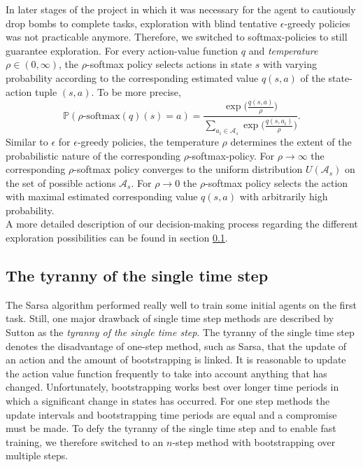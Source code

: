 In later stages of the project in which it was necessary for the agent to cautiously drop bombs to complete tasks, exploration with blind tentative $\epsilon$-greedy policies was not practicable anymore. Therefore, we switched to softmax-policies to still guarantee exploration. For every action-value function $q$ and \emph{temperature} $\rho \in (0, \infty)$, the $\rho$-softmax policy selects actions in state $s$ with varying probability according to the corresponding estimated value $q(s, a)$ of the state-action tuple $(s, a)$. To be more precise, 
\begin{equation*}
	\mathbb{P}(\rho\text{-softmax}(q)(s) = a) = \frac{\exp\Big(\frac{q(s, a)}{\rho}\Big)}{\sum_{a_i \in \mathcal{A}_s} \exp\Big(\frac{q(s, a_i)}{\rho}\Big)}.
\end{equation*}
Similar to $\epsilon$ for $\epsilon$-greedy policies, the temperature $\rho$ determines the extent of the probabilistic nature of the corresponding $\rho$-softmax-policy. For $\rho \rightarrow \infty$ the corresponding $\rho$-softmax policy converges to the uniform distribution $U(\mathcal{A}_s)$ on the set of possible actions $\mathcal{A}_s$. For $\rho \rightarrow 0$ the $\rho$-softmax policy selects the action with maximal estimated corresponding value $q(s, a)$ with arbitrarily high probability. \\

A more detailed description of our decision-making process regarding the different exploration possibilities can be found in section \ref{}.

\subsection{The tyranny of the single time step}

The Sarsa algorithm performed really well to train some initial agents on the first task. Still, one major drawback of single time step methods are described by Sutton as the \emph{tyranny of the single time step}. The tyranny of the single time step denotes the disadvantage of one-step method, such as Sarsa, that the update of an action and the amount of bootstrapping is linked. It is reasonable to update the action value function frequently to take into account anything that has changed. Unfortunately, bootstrapping works best  over longer time periods in which a significant change in states has occurred. For one step methods the update intervals and bootstrapping time periods are equal and a compromise must be made. To defy the tyranny of the single time step and to enable fast training, we therefore switched to an $n$-step method with bootstrapping over multiple steps.

